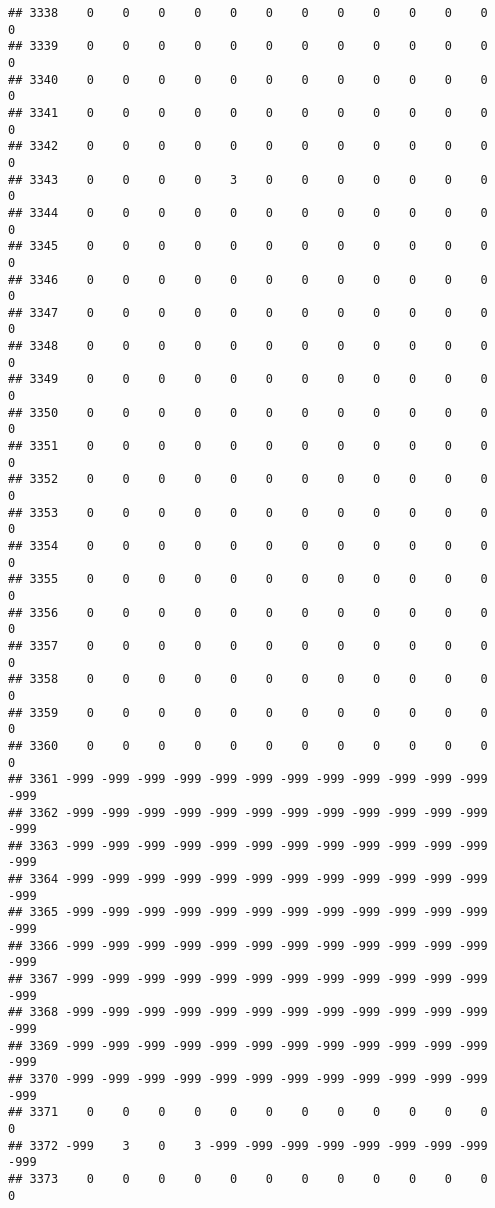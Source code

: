 \documentclass[]{article}
\begin{document}
\begin{verbatim}
## 3338    0    0    0    0    0    0    0    0    0    0    0    0    0
## 3339    0    0    0    0    0    0    0    0    0    0    0    0    0
## 3340    0    0    0    0    0    0    0    0    0    0    0    0    0
## 3341    0    0    0    0    0    0    0    0    0    0    0    0    0
## 3342    0    0    0    0    0    0    0    0    0    0    0    0    0
## 3343    0    0    0    0    3    0    0    0    0    0    0    0    0
## 3344    0    0    0    0    0    0    0    0    0    0    0    0    0
## 3345    0    0    0    0    0    0    0    0    0    0    0    0    0
## 3346    0    0    0    0    0    0    0    0    0    0    0    0    0
## 3347    0    0    0    0    0    0    0    0    0    0    0    0    0
## 3348    0    0    0    0    0    0    0    0    0    0    0    0    0
## 3349    0    0    0    0    0    0    0    0    0    0    0    0    0
## 3350    0    0    0    0    0    0    0    0    0    0    0    0    0
## 3351    0    0    0    0    0    0    0    0    0    0    0    0    0
## 3352    0    0    0    0    0    0    0    0    0    0    0    0    0
## 3353    0    0    0    0    0    0    0    0    0    0    0    0    0
## 3354    0    0    0    0    0    0    0    0    0    0    0    0    0
## 3355    0    0    0    0    0    0    0    0    0    0    0    0    0
## 3356    0    0    0    0    0    0    0    0    0    0    0    0    0
## 3357    0    0    0    0    0    0    0    0    0    0    0    0    0
## 3358    0    0    0    0    0    0    0    0    0    0    0    0    0
## 3359    0    0    0    0    0    0    0    0    0    0    0    0    0
## 3360    0    0    0    0    0    0    0    0    0    0    0    0    0
## 3361 -999 -999 -999 -999 -999 -999 -999 -999 -999 -999 -999 -999 -999
## 3362 -999 -999 -999 -999 -999 -999 -999 -999 -999 -999 -999 -999 -999
## 3363 -999 -999 -999 -999 -999 -999 -999 -999 -999 -999 -999 -999 -999
## 3364 -999 -999 -999 -999 -999 -999 -999 -999 -999 -999 -999 -999 -999
## 3365 -999 -999 -999 -999 -999 -999 -999 -999 -999 -999 -999 -999 -999
## 3366 -999 -999 -999 -999 -999 -999 -999 -999 -999 -999 -999 -999 -999
## 3367 -999 -999 -999 -999 -999 -999 -999 -999 -999 -999 -999 -999 -999
## 3368 -999 -999 -999 -999 -999 -999 -999 -999 -999 -999 -999 -999 -999
## 3369 -999 -999 -999 -999 -999 -999 -999 -999 -999 -999 -999 -999 -999
## 3370 -999 -999 -999 -999 -999 -999 -999 -999 -999 -999 -999 -999 -999
## 3371    0    0    0    0    0    0    0    0    0    0    0    0    0
## 3372 -999    3    0    3 -999 -999 -999 -999 -999 -999 -999 -999 -999
## 3373    0    0    0    0    0    0    0    0    0    0    0    0    0

\end{verbatim}
\end{document}
